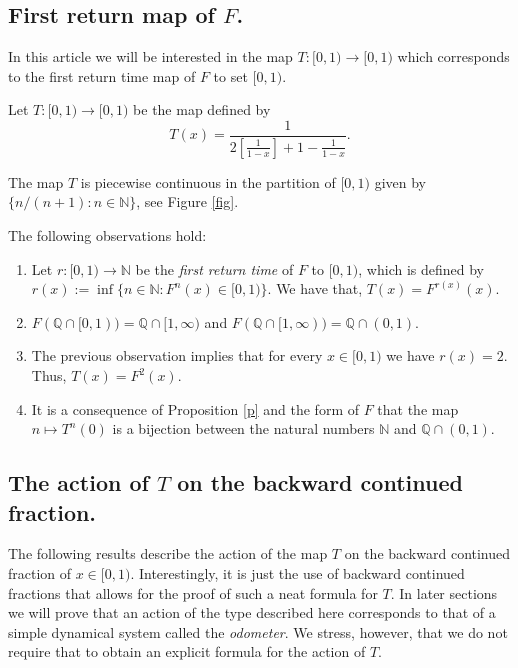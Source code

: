 \documentclass[letterpaper,10pt,reqno]{amsart}
\numberwithin{equation}{section}     %
\newcommand{\N}{\mathbb{N}}
\def\N{{\mathbb N}}
\def\Q{{\mathbb Q}}
\begin{document}
 \subsection{First return map of $F$.} In this article we  will be interested in the map $T:[0,1) \to [0,1)$ which corresponds to the first return time map of $F$ to set $[0,1)$.
 
\begin{definition}
Let $T:[0,1) \to [0,1)$ be the map defined by
\begin{equation*}
T(x)= \frac{1}{2\left[\frac{1}{1-x}	\right] + 1 - \frac{1}{1-x}}.
\end{equation*}
\end{definition}
The map $T$ is piecewise continuous in the partition of $[0,1)$ given by $\{n/(n+1) : n\in \N \}$, see Figure \ref{fig}.

\begin{remark}
The following observations hold:
\begin{enumerate}
\item Let $r:[0,1) \to \N $ be the \emph{first return time} of $F$ to $[0,1)$, which is defined by $r(x):= \inf \{ n \in \N : F^{n}(x) \in [0,1) \}$. We have that, $T(x)=F^{r(x)}(x)$.
\item $F(\Q\cap [0,1))=\Q\cap[1,\infty)$ and $F(\Q\cap [1,\infty))=\Q\cap (0,1)$.
\item The previous observation implies that for every $x \in [0,1)$ we have  $r(x)=2$. Thus,  $T(x)=F^2(x)$.
\item It is a consequence of Proposition \ref{p} and the form of $F$ that the map $n \mapsto T^n(0)$ is a bijection between the natural numbers $\N$ and   $\Q \cap (0,1)$.  
\end{enumerate}
\end{remark} 


 
 
 \subsection{The action of $T$ on the backward continued fraction.}

The following results describe the action of the map $T$ on the backward continued fraction of $x \in [0,1)$. Interestingly, it is just the use of backward continued fractions that allows for the proof of such a  neat formula for $T$. In later sections we will prove that an action of the type described here corresponds to that of a simple dynamical system called {{}{the}} \emph{odometer}. We stress, however, that we do not {{}{require}} that to obtain an explicit formula for the action of $T$.
\end{document}
